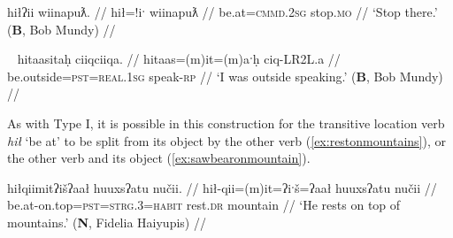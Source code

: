 \ex \label{ex:stopthere}
\begingl
\glpreamble hiłʔii wiinapuƛ. //
\gla hił=!iˑ wiinapuƛ //
\glb be.at=\textsc{cmmd.2sg} stop.\textsc{mo} //
\glft `Stop there.' (\textbf{B}, Bob Mundy) //
\endgl
\xe

\begin{comment}
\ex \label{ex:workathome}
\begingl
\glpreamble hiłitin maḥt̓iiʔakqas mamuuk. //
\gla hił=(m)it=(m)in maḥt̓ii=ʔak=qaˑs mamuuk //
\glb be.at=\textsc{pst}=\textsc{strg.1pl} house=\textsc{poss}=\textsc{defn.1sg} work.\textsc{dr} //
\glft `We worked at my house.' (\textbf{N}, Fidelia Haiyupis) //
\endgl
\xe

\ex \label{ex:screamatbeach}
\begingl
\glpreamble n̓aʔiičiʔeƛ naʔuu łuucma ʕiikʕiika hitinqis. //
\gla n̓a-°iˑčiƛ=!aƛ naʔuu łuucma ʕik-LR2L.a hitinqis //
\glb see-\textsc{in}=\textsc{now} be.with woman=\textsc{poss} scream-\textsc{rp} be.at.beach //
\glft `He heard a woman screaming on the beach.' (\textbf{C}, \textit{tupaat} Julia Lucas) //
\endgl
\xe
\end{comment}


\ex~ \label{ex:speakoutside}
\begingl
\glpreamble hitaasitaḥ ciiqciiqa. //
\gla hitaas=(m)it=(m)aˑḥ ciq-LR2L.a //
\glb be.outside=\textsc{pst}=\textsc{real.1sg} speak-\textsc{rp} //
\glft `I was outside speaking.' (\textbf{B}, Bob Mundy) //
\endgl
\xe

\begin{comment}
\ex~ \label{ex:speakoutside}
\begingl
\glpreamble qiiʔaƛintiis mamuuk ƛ̓aaʔaas. //
\gla qii=!aƛ=int=iis mamuuk ƛ̓aaʔaas //
\glb long.time=\textsc{now}=\textsc{pst}=\textsc{weak.1sg} work.\textsc{dr} be.outside //
\glft `I was working outside for a long time.' (\textbf{Q}, Sophie Billy) //
\endgl
\xe

\ex~ \label{ex:hideonroof}
\begingl
\glpreamble haptsaapaqƛiis suutił hiłaayiłkʷ. //
\gla hapt-saˑp=ʔaqƛ=iis sut-L.(č)ił hił-aˑyił=uk. //
\glb hide-\textsc{mo.caus}=\textsc{fut}=\textsc{weak.1sg} \textsc{2sg}-do.to be.at-on.a.roof=\textsc{poss} //
\glft `I will hide you on the roof.' (\textbf{Q}, Sophie Billy) //
\endgl
\xe
\end{comment}

As with Type I, it is possible in this construction for the transitive location verb \textit{hił} `be at' to be split from its object by the other verb (\ref{ex:restonmountains}), or the other verb and its object (\ref{ex:sawbearonmountain}).

\ex \label{ex:restonmountains}
\begingl
\glpreamble hiłqiimitʔišʔaał huuxsʔatu nučii. //
\gla hił-qii=(m)it=ʔiˑš=ʔaał huuxsʔatu nučii //
\glb be.at-on.top=\textsc{pst}=\textsc{strg.3}=\textsc{habit} rest.\textsc{dr} mountain //
\glft `He rests on top of mountains.' (\textbf{N}, Fidelia Haiyupis) //
\endgl
\xe

